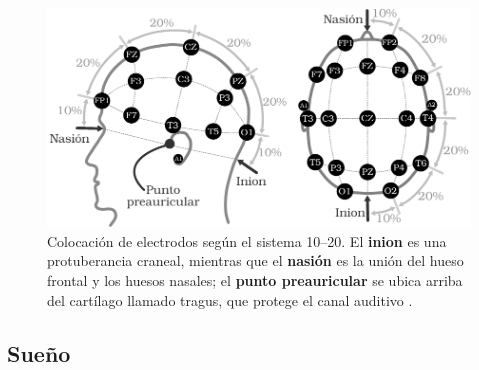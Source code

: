 \begin{figure}
\centering
\includegraphics[width=\linewidth]{./img_diagramas/cabeza_proporcionada.pdf} 
\caption{Colocación de electrodos según el sistema 10--20. El \textbf{inion} es 
una protuberancia craneal, mientras que el \textbf{nasión} es la unión del hueso frontal y los 
huesos nasales; el \textbf{punto preauricular} se ubica arriba del cartílago llamado tragus, que 
protege el canal auditivo \cite{Butkov07}. 
}
\label{img1020}
\end{figure}



\subsection{Sueño}

%

